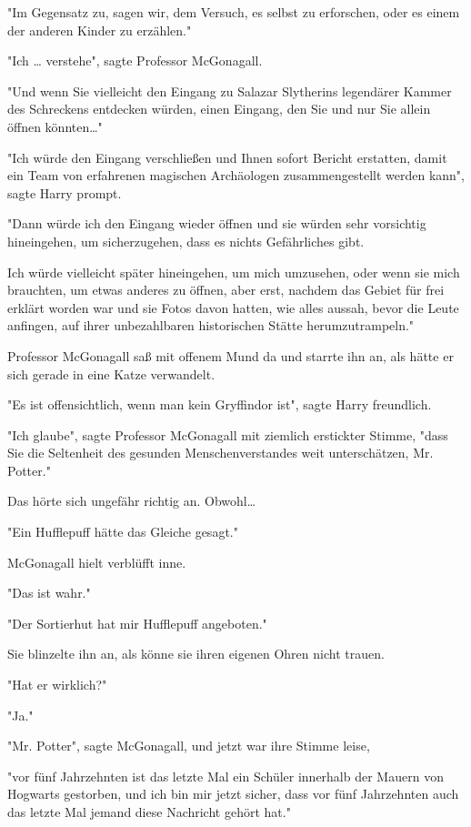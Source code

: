 {"Im Gegensatz zu, sagen wir, dem Versuch, es selbst zu erforschen, oder es einem der anderen Kinder zu erzählen."

"Ich … verstehe", sagte Professor McGonagall.

"Und wenn Sie vielleicht den Eingang zu Salazar Slytherins legendärer Kammer des Schreckens entdecken würden, einen Eingang, den Sie und nur Sie allein öffnen könnten…"

"Ich würde den Eingang verschließen und Ihnen sofort Bericht erstatten, damit ein Team von erfahrenen magischen Archäologen zusammengestellt werden kann", sagte Harry prompt.

"Dann würde ich den Eingang wieder öffnen und sie würden sehr vorsichtig hineingehen, um sicherzugehen, dass es nichts Gefährliches gibt.

Ich würde vielleicht später hineingehen, um mich umzusehen, oder wenn sie mich brauchten, um etwas anderes zu öffnen, aber erst, nachdem das Gebiet für frei erklärt worden war und sie Fotos davon hatten, wie alles aussah, bevor die Leute anfingen, auf ihrer unbezahlbaren historischen Stätte herumzutrampeln."

Professor McGonagall saß mit offenem Mund da und starrte ihn an, als hätte er sich gerade in eine Katze verwandelt.

"Es ist offensichtlich, wenn man kein Gryffindor ist", sagte Harry freundlich.

"Ich glaube", sagte Professor McGonagall mit ziemlich erstickter Stimme, "dass Sie die Seltenheit des gesunden Menschenverstandes weit unterschätzen, Mr. Potter."

Das hörte sich ungefähr richtig an. Obwohl…

"Ein Hufflepuff hätte das Gleiche gesagt."

McGonagall hielt verblüfft inne.

"Das ist wahr."

"Der Sortierhut hat mir Hufflepuff angeboten."

Sie blinzelte ihn an, als könne sie ihren eigenen Ohren nicht trauen.

"Hat er wirklich?"

"Ja."

"Mr. Potter", sagte McGonagall, und jetzt war ihre Stimme leise,

"vor fünf Jahrzehnten ist das letzte Mal ein Schüler innerhalb der Mauern von Hogwarts gestorben, und ich bin mir jetzt sicher, dass vor fünf Jahrzehnten auch das letzte Mal jemand diese Nachricht gehört hat."

}
